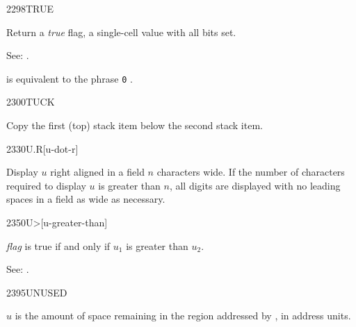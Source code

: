 \begin{newword}{2298}{TRUE}

	Return a \emph{true} flag, a single-cell value with all
	bits set.

\item[See:]
	.

	\begin{rationale} %
		 is equivalent to the phrase
		\texttt{0} . 
	\end{rationale}
\end{newword}


\begin{newword}{2300}{TUCK}

	Copy the first (top) stack item below the second stack item.
\end{newword}


\begin{newword}{2330}{U.R}[u-dot-r]

	Display $u$ right aligned in a field $n$ characters wide. If
	the number of characters required to display $u$ is greater
	than $n$, all digits are displayed with no leading spaces in
	a field as wide as necessary.
\end{newword}


\begin{newword}[Umore]{2350}{U>}[u-greater-than]

	\emph{flag} is true if and only if $u_1$ is greater than $u_2$.

\item[See:]
	.
\end{newword}


\begin{newword}{2395}{UNUSED}

	$u$ is the amount of space remaining in the region addressed
	by , in address units.
\end{newword}



